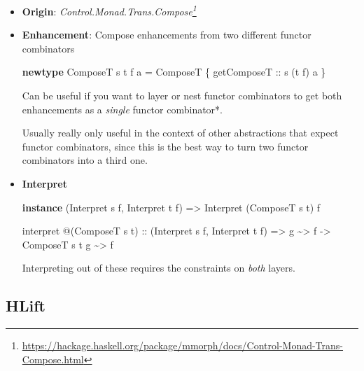 \documentclass[]{article}
\newenvironment{Shaded}{}{}
\newcommand{\DataTypeTok}[1]{\textcolor[rgb]{0.56,0.13,0.00}{#1}}
\newcommand{\KeywordTok}[1]{\textcolor[rgb]{0.00,0.44,0.13}{\textbf{#1}}}
\newcommand{\NormalTok}[1]{#1}
\newcommand{\OperatorTok}[1]{\textcolor[rgb]{0.40,0.40,0.40}{#1}}
\newcommand{\OtherTok}[1]{\textcolor[rgb]{0.00,0.44,0.13}{#1}}
\renewcommand{\href}[2]{#2\footnote{\url{#1}}}
\begin{document}
\begin{itemize}
\item
  \textbf{Origin}:
  \emph{\href{https://hackage.haskell.org/package/mmorph/docs/Control-Monad-Trans-Compose.html}{Control.Monad.Trans.Compose}}
\item
  \textbf{Enhancement}: Compose enhancements from two different functor
  combinators

\begin{Shaded}
\begin{Highlighting}[]
\KeywordTok{newtype} \DataTypeTok{ComposeT}\NormalTok{ s t f a }\OtherTok{=} \DataTypeTok{ComposeT}\NormalTok{ \{}\OtherTok{ getComposeT ::}\NormalTok{ s (t f) a \}}
\end{Highlighting}
\end{Shaded}

  Can be useful if you want to layer or nest functor combinators to get both
  enhancements as a \emph{single} functor combinator*.

  Usually really only useful in the context of other abstractions that expect
  functor combinators, since this is the best way to turn two functor
  combinators into a third one.
\item
  \textbf{Interpret}

\begin{Shaded}
\begin{Highlighting}[]
\KeywordTok{instance}\NormalTok{ (}\DataTypeTok{Interpret}\NormalTok{ s f, }\DataTypeTok{Interpret}\NormalTok{ t f) }\OtherTok{=>} \DataTypeTok{Interpret}\NormalTok{ (}\DataTypeTok{ComposeT}\NormalTok{ s t) f}

\NormalTok{interpret }\OperatorTok{@}\NormalTok{(}\DataTypeTok{ComposeT}\NormalTok{ s t)}
\OtherTok{    ::}\NormalTok{ (}\DataTypeTok{Interpret}\NormalTok{ s f, }\DataTypeTok{Interpret}\NormalTok{ t f)}
    \OtherTok{=>}\NormalTok{ g }\OperatorTok{\textasciitilde{}>}\NormalTok{ f}
    \OtherTok{{-}>} \DataTypeTok{ComposeT}\NormalTok{ s t g }\OperatorTok{\textasciitilde{}>}\NormalTok{ f}
\end{Highlighting}
\end{Shaded}

  Interpreting out of these requires the constraints on \emph{both} layers.
\end{itemize}

\hypertarget{hlift}{%
\subsection{HLift}\label{hlift}}
\end{document}
